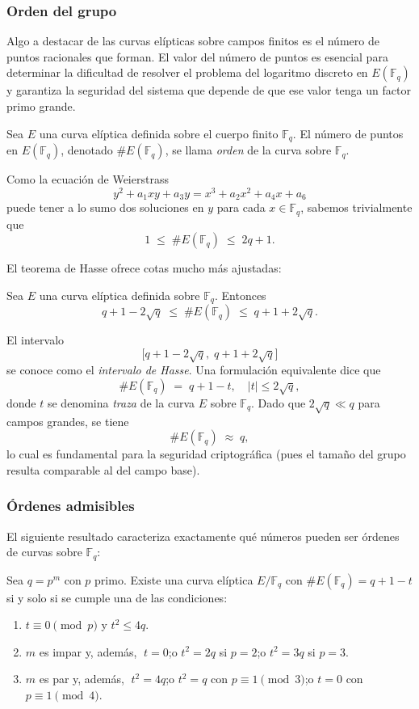 \subsubsection*{Orden del grupo}\label{subsec:orden_del_grupo}
Algo a destacar de las curvas elípticas sobre campos finitos es el número de puntos racionales que forman. El valor del número de puntos es esencial para determinar la dificultad de resolver el problema del logaritmo discreto en \(E(\mathbb{F}_q)\) y garantiza la seguridad del sistema que depende de que ese valor tenga un factor primo grande.

Sea \(E\) una curva elíptica definida sobre el cuerpo finito \(\mathbb{F}_q\).  
El número de puntos en \(E(\mathbb{F}_q)\), denotado \(\#E(\mathbb{F}_q)\), se llama \emph{orden} de la curva sobre \(\mathbb{F}_q\).  

Como la ecuación de Weierstrass
\[
y^2 + a_1 x y + a_3 y = x^3 + a_2 x^2 + a_4 x + a_6
\]
puede tener a lo sumo dos soluciones en \(y\) para cada \(x\in\mathbb{F}_q\), sabemos trivialmente que
\[
1 \;\le\;\#E(\mathbb{F}_q)\;\le\;2q+1.
\]

El teorema de Hasse ofrece cotas mucho más ajustadas:

\begin{teorema}[Hasse]
Sea \(E\) una curva elíptica definida sobre \(\mathbb{F}_q\). Entonces
\[
  q + 1 - 2\sqrt{q}\;\le\;\#E(\mathbb{F}_q)\;\le\;q + 1 + 2\sqrt{q}.
\]
\end{teorema}

El intervalo
\[
  \bigl[q+1-2\sqrt{q},\;q+1+2\sqrt{q}\bigr]
\]
se conoce como el \emph{intervalo de Hasse}. Una formulación equivalente dice que
\[
  \#E(\mathbb{F}_q) \;=\; q + 1 - t,
  \quad
  |t|\le2\sqrt{q},
\]
donde \(t\) se denomina \emph{traza} de la curva \(E\) sobre \(\mathbb{F}_q\). Dado que \(2\sqrt q\ll q\) para campos grandes, se tiene
\[
  \#E(\mathbb{F}_q)\;\approx\;q,
\]
lo cual es fundamental para la seguridad criptográfica (pues el tamaño del grupo resulta comparable al del campo base).

\subsubsection*{Órdenes admisibles}

El siguiente resultado caracteriza exactamente qué números pueden ser órdenes de curvas sobre \(\mathbb{F}_q\):

\begin{teorema}
Sea \(q=p^m\) con \(p\) primo. Existe una curva elíptica \(E/\mathbb{F}_q\) con
\(\#E(\mathbb{F}_q)=q+1-t\) si y solo si se cumple una de las condiciones:
\begin{enumerate}
  \item \(t\equiv0\pmod p\) y \(t^2\le4q\).
  \item \(m\) es impar y, además,  
    \(\;t=0\);\quad o \quad \(t^2=2q\) si \(p=2\);\quad o \quad \(t^2=3q\) si \(p=3\).
  \item \(m\) es par y, además,  
    \(\;t^2=4q\);\quad o \quad \(t^2=q\) con \(p\equiv1\pmod3\);\quad o \quad \(t=0\) con \(p\equiv1\pmod4\).
\end{enumerate}
\end{teorema}

